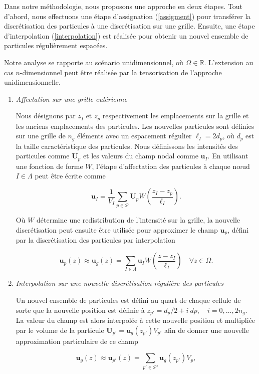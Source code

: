 Dans notre méthodologie, nous proposons une approche en deux étapes. Tout d'abord, nous effectuons une étape d'assignation (\ref{assigment}) pour transférer la discrétisation des particules à une discrétisation sur une grille. Ensuite, une étape d'interpolation (\ref{interpolation}) est réalisée pour obtenir un nouvel ensemble de particules régulièrement espacées.

Notre analyse se rapporte au scénario unidimensionnel, où $\Omega \in \mathbb{R}$. L'extension au cas $n$-dimensionnel peut être réalisée par la tensorisation de l'approche unidimensionnelle.

\begin{enumerate}[label=(\alph*)]
    \item \textit{Affectation sur une grille eulérienne}~\label{assigment}

          Nous désignons par $z_{I}$ et $z_{p}$ respectivement les emplacements sur la grille et les anciens emplacements des particules. Les nouvelles particules sont définies sur une grille de $n_g$ éléments avec un espacement régulier $\ell_I = 2 d_p$, où $d_p$ est la taille caractéristique des particules. Nous définissons les intensités des particules comme $\bm U_p$ et les valeurs du champ nodal comme $\bm u_I$. En utilisant une fonction de forme $W$, l'étape d'affectation des particules à chaque nœud $I \in \Lambda$ peut être écrite comme

          \[
              \bm{u}_I = \frac{1}{V_I} \sum_{p \in \mathcal{P}} \bm U_p  W \left(\frac{z_I - z_p}{\ell_I} \right).
          \]

          Où $W$ détermine une redistribution de l'intensité sur la grille, la nouvelle discrétisation peut ensuite être utilisée pour approximer le champ $\bm{u}_p$, défini par la discrétisation des particules par interpolation

          \[
              \bm{u}_p(z) \approx \bm{u}_g(z) = \sum_{I \in \Lambda} \bm u_I W \left(\frac{z - z_I}{\ell_I} \right) \quad \forall z \in \Omega.
          \]

    \item \textit{Interpolation sur une nouvelle discrétisation régulière des particules}~\label{interpolation}

          Un nouvel ensemble de particules est défini au quart de chaque cellule de sorte que la nouvelle position est définie à $z_{p'} = d_p/2 + i~dp, \quad i = 0,\dots, 2n_g $. La valeur du champ est alors interpolée à cette nouvelle position et multipliée par le volume de la particule $\bm{U}_{p'} = \bm  u_g(z_{p'}) V_{p'}$ afin de donner une nouvelle approximation particulaire de ce champ

          \[
              \bm{u}_g(z)  \approx \bm{u}_{p'}(z) = \sum_{p'\in\mathcal{P'}} \bm{u}_g(z_{p'}) V_p,
          \]

\end{enumerate}

